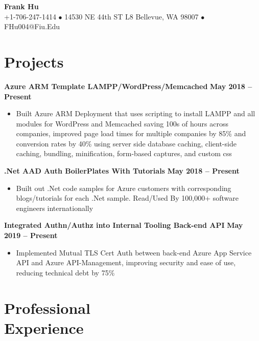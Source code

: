 \documentclass[margin,line]{resume}
\begin{document}
	{\centering \LARGE{\textbf{Frank Hu}}}
	\\
	\normalsize
	+1-706-247-1414 $\bullet$ 14530 NE 44th ST L8 Bellevue, WA 98007 $\bullet$ FHu004@Fiu.Edu
	
	\begin{resume}	
		
	
	\section{\mysidestyle Projects}
	
	\textbf{Azure ARM Template LAMPP/WordPress/Memcached}  \hfill \textbf{May 2018 -- Present}
	\vspace{1mm}
	\begin{itemize}
		\item Built Azure ARM Deployment that uses scripting to install LAMPP and all modules for WordPress and Memcached saving 100s of hours across companies, improved page load times for multiple companies by 85\% and conversion rates by 40\% using server side database caching, client-side caching, bundling, minification, form-based captures, and custom css
	\end{itemize}

	\textbf{.Net AAD Auth BoilerPlates With Tutorials}  \hfill \textbf{May 2018 -- Present}
	\vspace{1mm}
	\begin{itemize}
		\item Built out .Net code samples for Azure customers with corresponding blogs/tutorials for each .Net sample. Read/Used By 100,000+ software engineers internationally
	\end{itemize}
	
	\textbf{Integrated Authn/Authz into Internal Tooling Back-end API}  \hfill \textbf{May 2019 -- Present}
	\vspace{1mm}
	\begin{itemize}
		\item Implemented Mutual TLS Cert Auth between back-end Azure App Service API and Azure API-Management, improving security and ease of use, reducing technical debt by 75\%
	\end{itemize}
		
	\section{\mysidestyle Professional\\Experience}
	

\end{resume}
\end{document}
